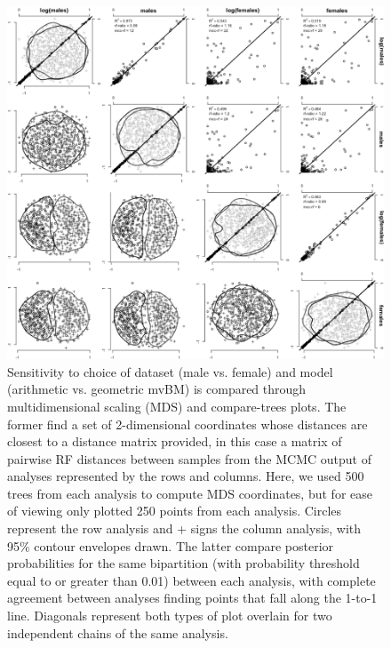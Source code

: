 \documentclass[10pt, twocolumn, twoside]{article}
\begin{document}
\begin{figure}[h]
\centering
\includegraphics[width=140mm]{figures/sensitivityHowells.png}
\caption[Visualizing Sensitivity to Researcher Degrees of Freedom in Analysis of Howells' Data]{Sensitivity to choice of dataset (male vs. female) and model (arithmetic vs. geometric mvBM) is compared through multidimensional scaling (MDS) and compare-trees plots. The former find a set of 2-dimensional coordinates whose distances are closest to a distance matrix provided, in this case a matrix of pairwise RF distances between samples from the MCMC output of analyses represented by the rows and columns. Here, we used 500 trees from each analysis to compute MDS coordinates, but for ease of viewing only plotted 250 points from each analysis. Circles represent the row analysis and + signs the column analysis, with 95\% contour envelopes drawn. The latter compare posterior probabilities for the same bipartition (with probability threshold equal to or greater than 0.01) between each analysis, with complete agreement between analyses finding points that fall along the 1-to-1 line. Diagonals represent both types of plot overlain for two independent chains of the same analysis.\label{overflow}
\label{sensitivitySexGeom}
}
\end{figure}
\end{document}
